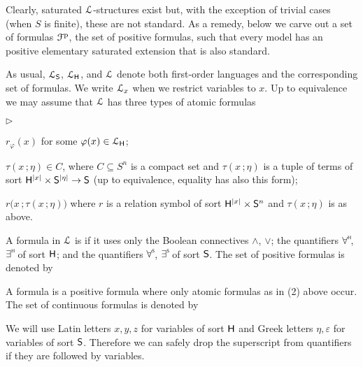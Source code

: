 \documentclass{amsproc}
\newcommand{\mylabel}[1]{{#1}\hfill}
\renewenvironment{itemize}
  {\begin{list}{$\triangleright$}{%
  \setlength{\parskip}{0mm}
  \setlength{\topsep}{.4\baselineskip}
  \setlength{\rightmargin}{0mm}
  \setlength{\listparindent}{0mm}
  \setlength{\itemindent}{0mm}
  \setlength{\labelwidth}{3ex}
  \setlength{\itemsep}{.2\baselineskip}
  \setlength{\parsep}{.2\baselineskip}
  \setlength{\partopsep}{0mm}
  \setlength{\labelsep}{1ex}
  \setlength{\leftmargin}{\labelwidth+\labelsep}
  \let\makelabel\mylabel}}{%
\end{list}}
\renewcommand*{\emph}[1]{%
   \smash{\tikz[baseline]\node[rectangle, fill=teal!25, rounded corners, inner xsep=0.5ex, inner ysep=0.2ex, anchor=base, minimum height = 2.7ex]{\strut #1};}}
\begin{document}
Clearly, saturated ${\EuScript L}$-structures exist but, with the exception of trivial cases (when $S$ is finite), these are not standard.
As a remedy, below we carve out a set of formulas ${\EuScript F}^{\rm p}$, the set of positive formulas, such that every model has an positive elementary saturated extension that is also standard.

As usual, ${\EuScript L}_{\sf S}$, ${\EuScript L}_{\sf H}$, and ${\EuScript L}$ denote both first-order languages and the corresponding set of formulas.
We write ${\EuScript L}_x$ when we restrict variables to $x$.
Up to equivalence we may assume that ${\EuScript L}$ has three types of atomic formulas

\begin{itemize}
  \item[1.] $r_\varphi(x)$ for some $\varphi(x)\in{\EuScript L}_{\sf H}$;
  \item[2.] $\tau(x\,;\eta)\in C$, where $C\subseteq S^n$ is a compact set and $\tau(x\,;\eta)$ is a tuple of terms of sort ${\sf H}^{|x|}\times {\sf S}^{|\eta|}\to {\sf S}$ (up to equivalence, equality has also this form);
  \item[3.] $r\big(x\,;\tau(x\,;\eta)\big)$ where $r$ is a relation symbol of sort ${\sf H}^{|x|}\times {\sf S}^n$ and $\tau(x\,;\eta)$ is as above.
\end{itemize}

\begin{definition}\label{def_LL}
  A formula in ${\EuScript L}$ is \emph{positive\/} if it uses only the Boolean connectives $\wedge$, $\vee$; the quantifiers $\forall\raisebox{1.1ex}{\scaleto{\sf H}{.8ex}\kern-.2ex}$, $\exists\raisebox{1.1ex}{\scaleto{\sf H}{.8ex}\kern-.2ex}$ of sort ${\sf H}$; and the quantifiers $\forall\raisebox{1.1ex}{\scaleto{\sf S}{.8ex}\kern-.2ex}$, $\exists\raisebox{1.1ex}{\scaleto{\sf S}{.8ex}\kern-.2ex}$ of sort ${\sf S}$.
  The set of positive formulas is denoted by \emph{${\EuScript F}^{\rm p}$.}

  A \emph{continuous\/} formula is a positive formula where only atomic formulas as in (2) above occur.
  The set of continuous formulas is denoted by \emph{${\EuScript F}^{\rm c}$.}


  We will use Latin letters $x,y,z$ for variables of sort ${\sf H}$ and Greek letters $\eta,\varepsilon$ for variables of sort ${\sf S}$.
  Therefore we can safely drop the superscript from quantifiers if they are followed by variables.
\end{definition}
\end{document}
